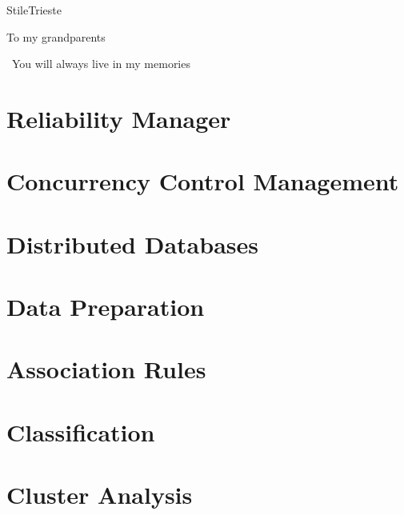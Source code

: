 \documentclass[pdfa,cucitura]{toptesi}
\begin{document}
\english


\expandafter\ifx\csname StileTrieste\endcsname\relax
\frontespizio
\else
	\paginavuota
	\begin{dedica}
		To my grandparents

		\textdagger\ You will always live in my memories
	\end{dedica}
	\tomo
\fi

\sommario


\indici

\mainmatter

\chapter{Reliability Manager}


\chapter{Concurrency Control Management}


\chapter{Distributed Databases}


\chapter{Data Preparation}


\chapter{Association Rules}


\chapter{Classification}


\chapter{Cluster Analysis}

\end{document}

